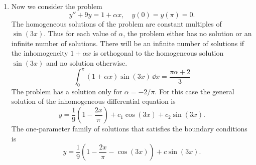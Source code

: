 {\begin{Solution}
\begin{enumerate}
    Consider the case $\lambda = 0$.  We find solutions of the homogeneous equation 
    that satisfy the left and right boundary conditions, respectively.
    \[
    y_1 = x, \qquad y_2 = x - \pi.
    \]
    We compute the Wronskian of these functions.
    \[
    W(x) = 
    \begin{vmatrix}
      x & x - \pi \\
      1 & 1 
    \end{vmatrix}
    = \pi.
    \]
    The Green function for this case is
    \[
    G(x|\xi) = \frac{x_< (x_> - \pi)}{\pi}.
    \]
    We consider the case $\lambda \neq n^2$, $\lambda \neq 0$.  
    We find the solutions of the homogeneous equation that satisfy 
    the left and right boundary conditions, respectively.
    \[
    y_1 = \sin \left( \sqrt{\lambda} x \right), \qquad 
    y_2 = \sin \left( \sqrt{\lambda} (x - \pi) \right).
    \]
    We compute the Wronskian of these functions.
    \[
    W(x) = 
    \begin{vmatrix}
      \sin \left( \sqrt{\lambda} x \right) &
      \sin \left( \sqrt{\lambda} (x - \pi) \right) \\
      \sqrt{\lambda} \cos \left( \sqrt{\lambda} x \right) &
      \sqrt{\lambda} \cos \left( \sqrt{\lambda} (x - \pi) \right)
    \end{vmatrix}
    = \sqrt{\lambda} \sin \left( \sqrt{\lambda} \pi \right)
    \]
    The Green function for this case is
    \[
    G(x|\xi) = \frac{ \sin \left( \sqrt{\lambda} x_< \right)
      \sin \left( \sqrt{\lambda} (x_> - \pi ) \right) }
    { \sqrt{\lambda} \sin \left( \sqrt{\lambda} \pi \right) }.
    \]

  \item
    Now we consider the problem
    \[
    y'' + 9 y = 1 + \alpha x, \quad y(0) = y(\pi) = 0.
    \]
    The homogeneous solutions of the problem
    are constant multiples of $\sin(3 x)$.  
    Thus for each value of $\alpha$, the problem either has no solution or an
    infinite number of solutions.  There will be an infinite number
    of solutions if the inhomogeneity $1 + \alpha x$ is orthogonal to the
    homogeneous solution $\sin(3 x)$ and no solution otherwise.
    \[
    \int_0^\pi (1 + \alpha x) \sin(3 x) \,\dd x = \frac{\pi \alpha + 2}{3}
    \]
    The problem has a solution only for $\alpha = - 2/\pi$.  For this case 
    the general solution of the inhomogeneous differential equation is
    \[
    y = \frac{1}{9} \left( 1 - \frac{2 x}{\pi} \right) + c_1 \cos(3 x) 
    + c_2 \sin(3 x).
    \]
    The one-parameter family of solutions that satisfies the boundary 
    conditions is
    \[
    y = \frac{1}{9} \left( 1 - \frac{2 x}{\pi} - \cos(3 x) \right) + c \sin(3 x).
    \]


\end{enumerate}
\end{Solution}}
